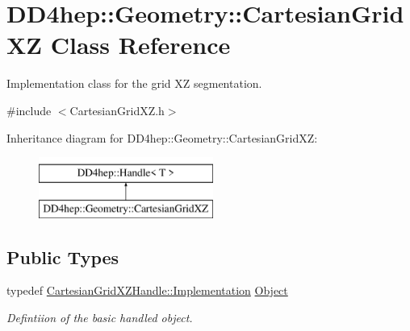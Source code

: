\hypertarget{class_d_d4hep_1_1_geometry_1_1_cartesian_grid_x_z}{}\section{D\+D4hep\+:\+:Geometry\+:\+:Cartesian\+Grid\+XZ Class Reference}
\label{class_d_d4hep_1_1_geometry_1_1_cartesian_grid_x_z}


Implementation class for the grid XZ segmentation.  




{\ttfamily \#include $<$Cartesian\+Grid\+X\+Z.\+h$>$}

Inheritance diagram for D\+D4hep\+:\+:Geometry\+:\+:Cartesian\+Grid\+XZ\+:\begin{figure}[H]
\begin{center}
\leavevmode
\includegraphics[height=2.000000cm]{class_d_d4hep_1_1_geometry_1_1_cartesian_grid_x_z}
\end{center}
\end{figure}
\subsection*{Public Types}
\begin{DoxyCompactItemize}
\item 
typedef \hyperlink{class_d_d4hep_1_1_handle_ad7ff728a25806079516b8965b9113f1a}{Cartesian\+Grid\+X\+Z\+Handle\+::\+Implementation} \hyperlink{class_d_d4hep_1_1_geometry_1_1_cartesian_grid_x_z_aba1e511c43a8b46f2524a1253c660f10}{Object}
\begin{DoxyCompactList}\small\item\em Defintiion of the basic handled object. \end{DoxyCompactList}\end{DoxyCompactItemize}
